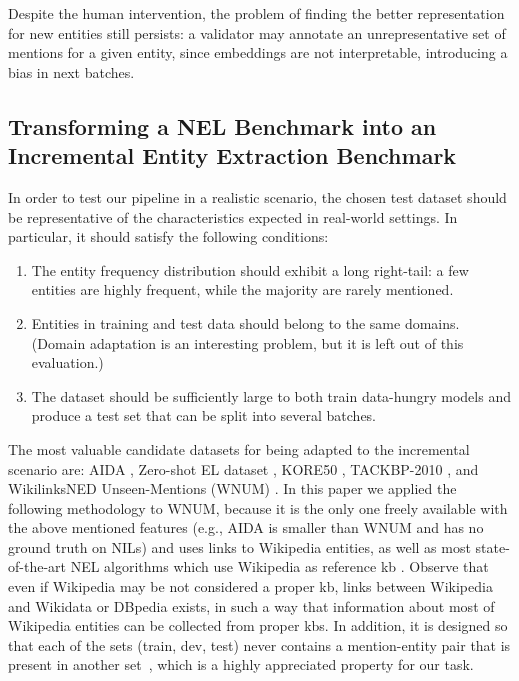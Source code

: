 Despite the human intervention,
the problem of finding the better representation for new entities still persists: a validator may annotate an unrepresentative set of mentions for a given entity, since embeddings are not interpretable, introducing a bias in next batches.

\subsection{Transforming a NEL Benchmark into an Incremental Entity Extraction Benchmark}

In order to test our pipeline in a realistic scenario, the chosen test dataset should be representative of the characteristics expected in real-world settings. In particular, it should satisfy the following conditions:  

\begin{enumerate}
    \item The entity frequency distribution should exhibit a long right-tail: a few entities are highly frequent, while the majority are rarely mentioned.  
    \item Entities in training and test data should belong to the same domains. (Domain adaptation is an interesting problem, but it is left out of this evaluation.)  
    \item The dataset should be sufficiently large to both train data-hungry models and produce a test set that can be split into several batches.  
\end{enumerate}


The most valuable candidate datasets for being adapted to the incremental scenario are: AIDA \cite{aida}, Zero-shot EL dataset \cite{logeswaran-etal-2019-zero}, KORE50 \cite{kore50}, TACKBP-2010 \cite{ji2010overview}, and WikilinksNED Unseen-Mentions (WNUM) \cite{Onoe_Durrett_2020}.
In this paper we applied the following methodology to WNUM, because it is the only one freely available with the above mentioned features (e.g., AIDA is smaller than WNUM and has no ground truth on NILs) and uses links to Wikipedia entities, as well as most state-of-the-art NEL algorithms which use Wikipedia as reference \ac{kb} \cite{blink,decao2021autoregressive,barba-etal-2022-extend}. Observe that even if Wikipedia may be not considered a proper \ac{kb}, links between Wikipedia and Wikidata or DBpedia exists, in such a way that information about most of Wikipedia entities can be collected from proper \acp{kb}. 
In addition, it is designed so that each of the sets (train, dev, test) never contains a mention-entity pair that is present in another set~\cite{Onoe_Durrett_2020}, which is a highly appreciated property for our task.

